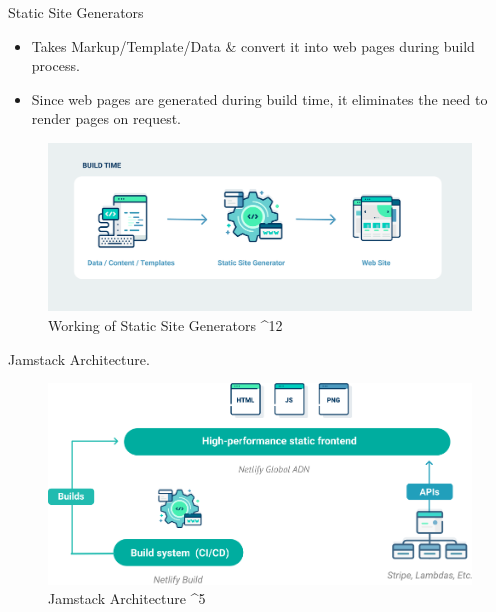 \documentclass[aspectratio=169,9pt]{beamer}
\begin{document}
\begin{frame}{Static Site Generators}
\vspace{2em}
\begin{itemize}
    \item Takes Markup/Template/Data \& convert it into web pages during build process.
    \item Since web pages are generated during build time, it eliminates the need to render pages on request.
\end{itemize}
\vfill
\begin{figure}
        \begin{center}
            \includegraphics[scale=.12]{images/static-site-generators.png}
            \caption{Working of Static Site Generators ^{12}}
        \end{center} 
\end{figure}
    
\end{frame}

\begin{frame}{Jamstack Architecture.}
\vspace{2em}
\begin{figure}
    \begin{center}
            \includegraphics[scale=.3]{images/how-it-works.png}
            \caption{Jamstack Architecture ^5}
    \end{center}
    \end{figure}    
\end{frame}
\end{document}
